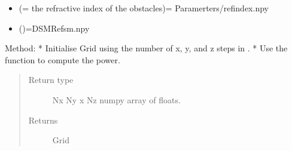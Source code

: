 \documentclass[letterpaper,10pt,english]{sphinxmanual}
\begin{document}
\begin{fulllineitems}
\begin{itemize}
\item {} 
(= the refractive index of the obstacles)=  Paramerters/refindex.npy\textasciigrave{}

\item {} 
()=\textasciigrave{}DSMRefsm.npy\textasciigrave{}

\end{itemize}

Method:
* Initialise Grid using the number of x, y, and z steps in .
* Use the function 
to compute the power.
\begin{quote}\begin{description}
\item[{Return type}] \leavevmode
Nx Ny x Nz numpy array of floats.

\item[{Returns}] \leavevmode
Grid

\end{description}\end{quote}

\end{fulllineitems}

\end{document}
